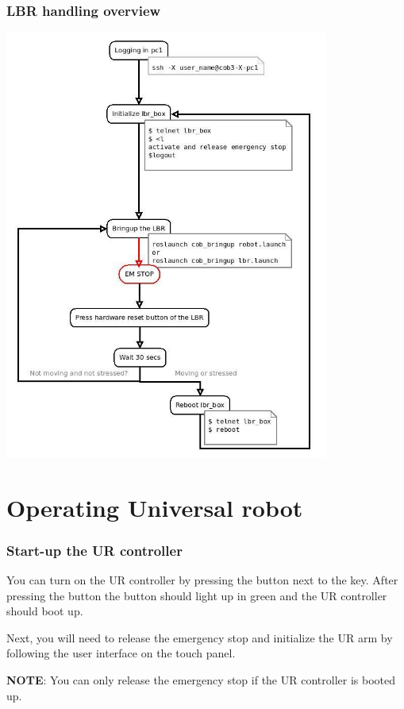 \subsubsection{LBR handling overview}
\begin{center}
 \includegraphics[width=0.8\textwidth]{images/lbr_diagram.jpg}
\end{center}

\section{Operating Universal robot} \label{UR}
\subsubsection{Start-up the UR controller}
You can turn on the UR controller by pressing the button next to the key. After pressing the button the button should light up in green and the UR controller should boot up.

Next, you will need to release the emergency stop and initialize the UR arm by following the user interface on the touch panel.

\textbf{NOTE}: You can only release the emergency stop if the UR controller is booted up.

